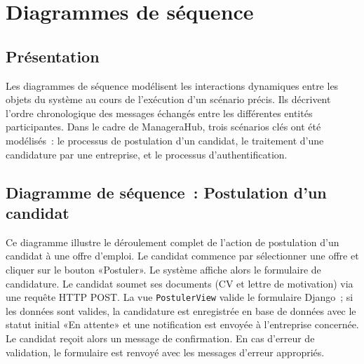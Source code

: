 \documentclass[12pt,a4paper]{report}
\begin{document}
\section{Diagrammes de séquence}

\subsection{Présentation}

Les diagrammes de séquence modélisent les interactions dynamiques entre les objets du système au cours de l'exécution d'un scénario précis. Ils décrivent l'ordre chronologique des messages échangés entre les différentes entités participantes. Dans le cadre de ManageraHub, trois scénarios clés ont été modélisés~: le processus de postulation d'un candidat, le traitement d'une candidature par une entreprise, et le processus d'authentification.

\subsection{Diagramme de séquence~: Postulation d'un candidat}

Ce diagramme illustre le déroulement complet de l'action de postulation d'un candidat à une offre d'emploi. Le candidat commence par sélectionner une offre et cliquer sur le bouton «Postuler». Le système affiche alors le formulaire de candidature. Le candidat soumet ses documents (CV et lettre de motivation) via une requête HTTP POST. La vue \texttt{PostulerView} valide le formulaire Django~; si les données sont valides, la candidature est enregistrée en base de données avec le statut initial «En attente» et une notification est envoyée à l'entreprise concernée. Le candidat reçoit alors un message de confirmation. En cas d'erreur de validation, le formulaire est renvoyé avec les messages d'erreur appropriés.
\end{document}
